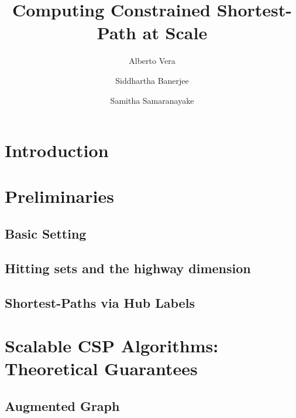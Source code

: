 \documentclass[format=acmsmall, review=false, screen=true]{acmart}
\begin{document}
\title{Computing Constrained Shortest-Path at Scale}  
\author{Alberto Vera}
\author{Siddhartha Banerjee}
\author{Samitha Samaranayake}

\begin{abstract}

\end{abstract}

\maketitle


\section{Introduction}


\section{Preliminaries}
\label{sec:prelim}

\subsection{Basic Setting}
\label{ssec:basic}


\subsection{Hitting sets and the highway dimension}
\label{ssec:hddef}


\subsection{Shortest-Paths via Hub Labels}
\label{ssec:hldef}


\section{Scalable CSP Algorithms:\texorpdfstring{\\}{ } Theoretical Guarantees}
\label{sec:chd}


\subsection{Augmented Graph}
\label{ssec:aug}

\end{document}

